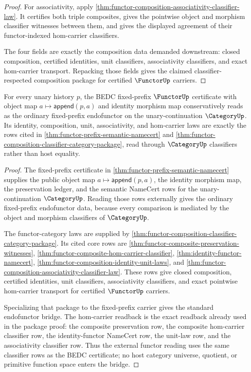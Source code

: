 \begin{proof}
For associativity, apply
\autoref{thm:functor-composition-associativity-classifier-law}. It certifies
both triple composites, gives the pointwise object and morphism classifier
witnesses between them, and gives the displayed agreement of their
functor-indexed hom-carrier classifiers.

The four fields are exactly the composition data demanded downstream: closed
composition, certified identities, unit classifiers, associativity
classifiers, and exact hom-carrier transport. Repacking those fields gives the
claimed classifier-respected composition package for certified $\FunctorUp$
carriers.
\end{proof}

\begin{theorem}
\label{thm:functor-prefix-standard-bridge}
For every unary history $p$, the BEDC fixed-prefix $\FunctorUp$ certificate
with object map $a\mapsto \mathsf{append}(p,a)$ and identity morphism map
conservatively reads as the ordinary fixed-prefix endofunctor on the
unary-continuation $\CategoryUp$. Its identity, composition, unit,
associativity, and hom-carrier laws are exactly the rows cited in
\autoref{thm:functor-prefix-semantic-namecert} and
\autoref{thm:functor-composition-classifier-category-package}, read through
$\CategoryUp$ classifiers rather than host equality.
\end{theorem}
\begin{proof}
The fixed-prefix certificate in
\autoref{thm:functor-prefix-semantic-namecert} supplies the public object map
$a\mapsto \mathsf{append}(p,a)$, the identity morphism map, the preservation
ledger, and the semantic NameCert rows for the unary-continuation
$\CategoryUp$. Reading those rows externally gives the ordinary fixed-prefix
endofunctor data, because every comparison is mediated by the object and
morphism classifiers of $\CategoryUp$.

The functor-category laws are supplied by
\autoref{thm:functor-composition-classifier-category-package}. Its cited core
rows are \autoref{thm:functor-composite-preservation-witnesses},
\autoref{thm:functor-composite-hom-carrier-classifier},
\autoref{thm:identity-functor-namecert},
\autoref{thm:functor-composition-identity-unit-laws}, and
\autoref{thm:functor-composition-associativity-classifier-law}. These rows give
closed composition, certified identities, unit classifiers, associativity
classifiers, and exact pointwise hom-carrier transport for certified
$\FunctorUp$ carriers.

Specializing that package to the fixed-prefix carrier gives the standard
endofunctor bridge. The hom-carrier readback is the exact readback already used
in the package proof: the composite preservation row, the composite
hom-carrier classifier row, the identity-functor NameCert row, the unit-law
row, and the associativity classifier row. Thus the external functor reading
uses the same classifier rows as the BEDC certificate; no host category
universe, quotient, or primitive function space enters the bridge.
\end{proof}

